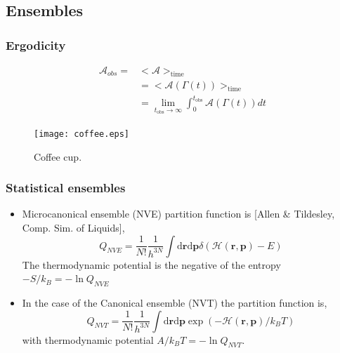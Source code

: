 \documentclass{beamer}
\begin{document}
\subsection{Ensembles} 

\begin{frame}\frametitle{Ergodicity}


\fboxsep=0pt
\noindent %
\begin{minipage}[t]{0.48\linewidth}

\begin{equation}
\begin{aligned}
\mathcal{A}_{obs} =  &  <\mathcal{A}>_{\mathrm{time}} \\
&= <\mathcal{A}(\Gamma (t))>_{\mathrm{time}}  \\
&= \lim_{t_{\mathrm{obs}} \rightarrow \infty } \int_0^{t_{\mathrm{obs}}}
\mathcal{A}(\Gamma (t)) dt
\end{aligned}
\end{equation}


\end{minipage}
\hfill%
\begin{minipage}[t]{0.48\linewidth}
\begin{figure}
\texttt{[image: coffee.eps]}
\caption{{\scriptsize  Coffee cup. }}
\end{figure}

\end{minipage}

\end{frame}

\begin{frame}\frametitle{Statistical ensembles}

\begin{itemize}
\item Microcanonical ensemble (NVE) partition function is [Allen \& Tildesley, Comp. Sim. of Liquids],
	\begin{equation}
		Q_{NVE}= \frac{1}{N!}\frac{1}{h^{3N}} \int \textrm{d}\mathbf{r} \textrm{d}\mathbf{p} 
		\delta (\mathcal{H}(\mathbf{r},\mathbf{p}) -E)
	\end{equation}
	The thermodynamic potential is the negative of the entropy $-S/k_{B} = -\ln Q_{NVE}$

\item In the case of the Canonical ensemble (NVT) the partition function is,
	\begin{equation}
		Q_{NVT}= \frac{1}{N!}\frac{1}{h^{3N}} \int \textrm{d}\mathbf{r} \textrm{d}\mathbf{p} 
	        \exp (-\mathcal{H}(\mathbf{r},\mathbf{p})/k_B T)
	\end{equation}
	with thermodynamic potential $A/k_B T = -\ln Q_{NVT}$.


\end{itemize}

\end{frame}
\end{document}
